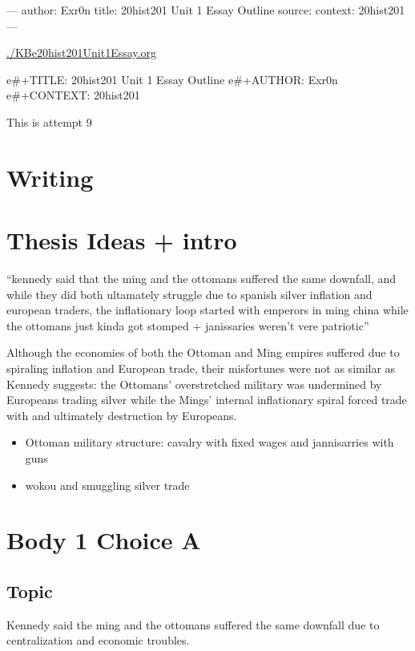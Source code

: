 \documentclass[letterpaper]{article}
\author{Taproot}
\date{\today}
\title{}
\renewcommand{\tableofcontents}{}
\begin{document}
\tableofcontents

---
author:  Exr0n
title:   20hist201 Unit 1 Essay Outline
source:  
context: 20hist201
---

\url{./KBe20hist201Unit1Essay.org}

e\#+TITLE: 20hist201 Unit 1 Essay Outline
e\#+AUTHOR: Exr0n
e\#+CONTEXT: 20hist201

This is attempt 9

\section{Writing}
\label{sec:org5a7c7bd}

\section{Thesis Ideas + intro}
\label{sec:orge0614c8}
“kennedy said that the ming and the ottomans suffered the same downfall, and while they did both ultamately struggle due to spanish silver inflation and european traders, the inflationary loop started with emperors in ming china while the ottomans just kinda got stomped + janissaries weren’t vere patriotic”

Although the economies of both the Ottoman and Ming empires suffered due to spiraling inflation and European trade, their misfortunes were not as similar as Kennedy suggests: the Ottomans' overstretched military was undermined by Europeans trading silver while the Mings' internal inflationary spiral forced trade with and ultimately destruction by Europeans.

\begin{itemize}
\item Ottoman military structure: cavalry with fixed wages and jannisarries with guns
\item wokou and smuggling silver trade
\end{itemize}

\section{Body 1 Choice A}
\label{sec:orgcf66b96}

\subsection{Topic}
\label{sec:org75217e3}
Kennedy said the ming and the ottomans suffered the same downfall due to centralization and economic troubles.
\end{document}
